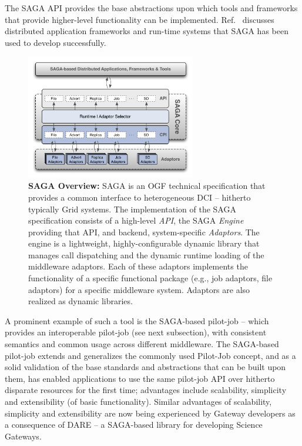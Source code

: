 \documentclass[]{svjour3}
\begin{document}
The SAGA API provides the base abstractions upon which tools and
frameworks that provide higher-level functionality can be
implemented. Ref.~\cite{saga_url} discusses distributed application
frameworks and run-time systems that SAGA has been used to develop
successfully. 

\begin{figure}[t]
\centering \includegraphics[width=0.66\textwidth]{figures/saga-architecture-1.png}
\caption{\textbf{SAGA Overview: } SAGA is an OGF technical
  specification that provides a common interface to heterogeneous DCI
  -- hitherto typically Grid systems.  The implementation of the
  SAGA\cite{saga_url} specification consists of a high-level {\it
    API}, the SAGA {\it Engine} providing that API, and backend,
  system-specific {\it Adaptors}.  The engine is a lightweight,
  highly-configurable dynamic library that manages call dispatching
  and the dynamic runtime loading of the middleware adaptors.  Each of
  these adaptors implements the functionality of a specific functional
  package (e.g., job adaptors, file adaptors) for a specific
  middleware system. Adaptors are also realized as dynamic libraries.}
 \label{fig:saga-overview}
\end{figure}
 
A prominent example of such a tool is the SAGA-based pilot-job – which
provides an interoperable pilot-job (see next subsection), with
consistent semantics and common usage across different middleware. The
SAGA-based pilot-job extends and generalizes the commonly used
Pilot-Job concept, and as a solid validation of the base standards and
abstractions that can be built upon them, has enabled applications to
use the same pilot-job API over hitherto disparate resources for the
first time; advantages include scalability, simplicity and
extensibility (of basic functionality). Similar advantages of
scalability, simplicity and extensibility are now being experienced by
Gateway developers as a consequence of DARE – a SAGA-based library for
developing Science Gateways.
\end{document}
